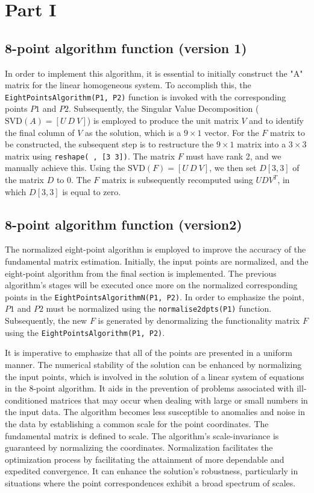 \section{Part I}\label{P1}

\subsection{8-point algorithm function (version 1)}

In order to implement this algorithm, it is essential to initially construct the "A" matrix for the linear homogeneous system. To accomplish this, the \texttt{EightPointsAlgorithm(P1, P2)} function is invoked with the corresponding points $P1$ and $P2$. Subsequently, the Singular Value Decomposition ($\text{SVD}(A) = [U \ D \ V]$) is employed to produce the unit matrix $V$ and to identify the final column of $V$ as the solution, which is a $9 \times 1$ vector. For the $F$ matrix to be constructed, the subsequent step is to restructure the $9 \times 1$ matrix into a $3 \times 3$ matrix using \texttt{reshape( , [3 3])}. The matrix $F$ must have rank 2, and we manually achieve this. Using the $\text{SVD}(F) = [U \ D \ V]$, we then set $D[3,3]$ of the matrix $D$ to 0. The $F$ matrix is subsequently recomputed using $U D V^T$, in which $D[3,3]$ is equal to zero.

\subsection{8-point algorithm function (version2)}

The normalized eight-point algorithm is employed to improve the accuracy of the fundamental matrix estimation. Initially, the input points are normalized, and the eight-point algorithm from the final section is implemented. The previous algorithm's stages will be executed once more on the normalized corresponding points in the \texttt{EightPointsAlgorithmN(P1, P2)}. In order to emphasize the point, $P1$ and $P2$ must be normalized using the \texttt{normalise2dpts(P1)} function. Subsequently, the new $F$ is generated by denormalizing the functionality matrix $F$ using the \texttt{EightPointsAlgorithm(P1, P2)}. 

It is imperative to emphasize that all of the points are presented in a uniform manner. The numerical stability of the solution can be enhanced by normalizing the input points, which is involved in the solution of a linear system of equations in the 8-point algorithm. It aids in the prevention of problems associated with ill-conditioned matrices that may occur when dealing with large or small numbers in the input data. The algorithm becomes less susceptible to anomalies and noise in the data by establishing a common scale for the point coordinates. The fundamental matrix is defined to scale. The algorithm's scale-invariance is guaranteed by normalizing the coordinates. Normalization facilitates the optimization process by facilitating the attainment of more dependable and expedited convergence. It can enhance the solution's robustness, particularly in situations where the point correspondences exhibit a broad spectrum of scales.

